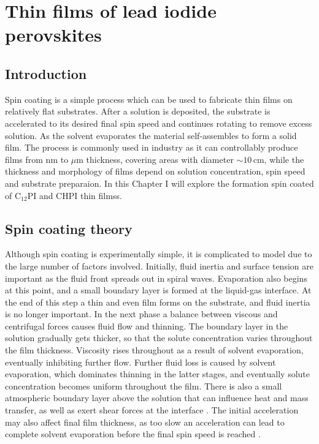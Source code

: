 
\chapter{Thin films of lead iodide perovskites}

\graphicspath{{Chapter4/Figures/}}

\section{Introduction}
Spin coating is a simple process which can be used to fabricate thin films on relatively flat substrates. After a solution is deposited, the substrate is accelerated to its desired final spin speed and continues rotating to remove excess solution. As the solvent evaporates the material self-assembles to form a solid film. The process is commonly used in industry as it can controllably produce films from nm to $\mu$m thickness, covering areas with diameter $\sim10$\,cm, while the thickness and morphology of films depend on solution concentration, spin speed and substrate preparaion. In this Chapter I will explore the formation spin coated of C$_{12}$PI and CHPI thin filmss.

\section{Spin coating theory}
Although spin coating is experimentally simple, it is complicated to model due to the large number of factors involved. Initially, fluid inertia and surface tension are important as the fluid front spreads out in spiral waves. Evaporation also begins at this point, and a small boundary layer is formed at the liquid-gas interface. At the end of this step a thin and even film forms on the substrate, and fluid inertia is no longer important. In the next phase a balance between viscous and centrifugal forces causes fluid flow and thinning. The boundary layer in the solution gradually gets thicker, so that the solute concentration varies throughout the film thickness. Viscosity rises throughout as a result of solvent evaporation, eventually inhibiting further flow. Further fluid loss is caused by solvent evaporation, which dominates thinning in the latter stages, and eventually solute concentration becomes uniform throughout the film. There is also a small atmospheric boundary layer above the solution that can influence heat and mass transfer, as well as exert shear forces at the interface \cite{Meyerhofer1978, VanHardeveld1995, Lawrence1988}. The initial acceleration may also affect final film thickness, as too slow an acceleration can lead to complete solvent evaporation before the final spin speed is reached \cite{Birnie2005}.

